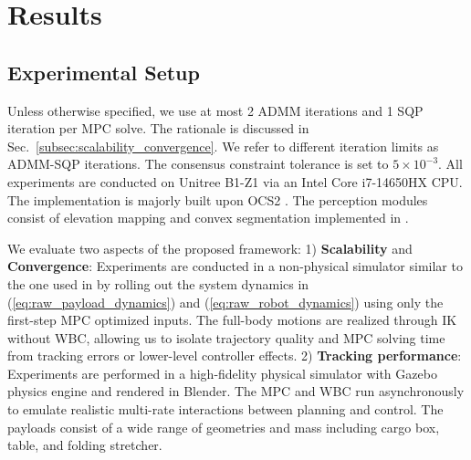 \section{Results}
\label{sec:experiment}
\subsection{Experimental Setup}
Unless otherwise specified, we use at most 2 ADMM iterations and 1 SQP iteration per MPC solve. The rationale is discussed in Sec.~\ref{subsec:scalability_convergence}. We refer to different iteration limits as ADMM-SQP iterations. The consensus constraint tolerance is set to $5 \times 10^{-3}$. All experiments are conducted on Unitree B1-Z1 via an Intel Core i7-14650HX CPU. The implementation is majorly built upon OCS2 \cite{OCS2}. The perception modules consist of elevation mapping and convex segmentation implemented in \cite{miki2022elevation}.

We evaluate two aspects of the proposed framework: 1) \textbf{Scalability} and \textbf{Convergence}: Experiments are conducted in a non-physical simulator similar to the one used in \cite{devincenti2023} by rolling out the system dynamics in (\ref{eq:raw_payload_dynamics}) and (\ref{eq:raw_robot_dynamics}) using only the first-step MPC optimized inputs. The full-body motions are realized through IK without WBC, allowing us to isolate trajectory quality and MPC solving time from tracking errors or lower-level controller effects. 2) \textbf{Tracking performance}: Experiments are performed in a high-fidelity physical simulator with Gazebo physics engine and rendered in Blender. The MPC and WBC run asynchronously to emulate realistic multi-rate interactions between planning and control. The payloads consist of a wide range of geometries and mass including cargo box, table, and folding stretcher.


